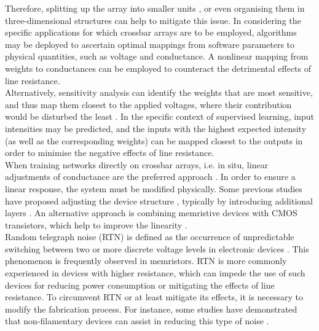 \noindent Therefore, splitting up the array into smaller units \cite{xia2016technological}, or even organising them in three-dimensional structures \cite{xia2019memristive} can help to mitigate this issue. In considering the specific applications for which crossbar arrays are to be employed, algorithms may be deployed to ascertain optimal mappings from software parameters to physical quantities, such as voltage and conductance.  A nonlinear mapping from weights to conductances can be employed to counteract the detrimental effects of line resistance. \\

\noindent Alternatively, sensitivity analysis can identify the weights that are most sensitive, and thus map them closest to the applied voltages, where their contribution would be disturbed the least \cite{agrawal2019x}. In the specific context of supervised learning, input intensities may be predicted, and the inputs with the highest expected intensity (as well as the corresponding weights) can be mapped closest to the outputs in order to minimise the negative effects of line resistance. \\

\noindent When training networks directly on crossbar arrays, i.e. in situ, linear adjustments of conductance are the preferred approach \cite{burr2015experimental}. In order to ensure a linear response, the system must be modified physically. Some previous studies have proposed adjusting the device structure \cite{woo2016improved}, typically by introducing additional layers \cite{wu2018methodology}. An alternative approach is combining memristive devices with CMOS transistors, which help to improve the linearity \cite{ambrogio2018equivalent}.\\

\noindent Random telegraph noise (RTN) is defined as the occurrence of unpredictable switching between two or more discrete voltage levels in electronic devices \cite{puglisi2016guidelines}. This phenomenon is frequently observed in memristors. RTN is more commonly experienced in devices with higher resistance, which can impede the use of such devices for reducing power consumption or mitigating the effects of line resistance. To circumvent RTN or at least mitigate its effects, it is necessary to modify the fabrication process. For instance, some studies have demonstrated that non-filamentary devices can assist in reducing this type of noise \cite{chai2018impact}. \\

